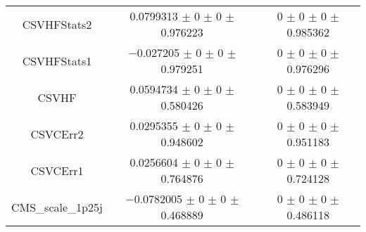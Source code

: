\begin{table}
\begin{tabular}{ccc}
CSVHFStats2 	& \num{0.0799313} $\pm$ \num{0} $\pm$ \num{0} $\pm$ \num{0.976223} 	& \num{0} $\pm$ \num{0} $\pm$ \num{0} $\pm$ \num{0.985362}\\
CSVHFStats1 	& \num{-0.027205} $\pm$ \num{0} $\pm$ \num{0} $\pm$ \num{0.979251} 	& \num{0} $\pm$ \num{0} $\pm$ \num{0} $\pm$ \num{0.976296}\\
CSVHF 	& \num{0.0594734} $\pm$ \num{0} $\pm$ \num{0} $\pm$ \num{0.580426} 	& \num{0} $\pm$ \num{0} $\pm$ \num{0} $\pm$ \num{0.583949}\\
CSVCErr2 	& \num{0.0295355} $\pm$ \num{0} $\pm$ \num{0} $\pm$ \num{0.948602} 	& \num{0} $\pm$ \num{0} $\pm$ \num{0} $\pm$ \num{0.951183}\\
CSVCErr1 	& \num{0.0256604} $\pm$ \num{0} $\pm$ \num{0} $\pm$ \num{0.764876} 	& \num{0} $\pm$ \num{0} $\pm$ \num{0} $\pm$ \num{0.724128}\\
CMS\_scale\_1p25j 	& \num{-0.0782005} $\pm$ \num{0} $\pm$ \num{0} $\pm$ \num{0.468889} 	& \num{0} $\pm$ \num{0} $\pm$ \num{0} $\pm$ \num{0.486118}\\
\bottomrule
\end{tabular}
\end{table}